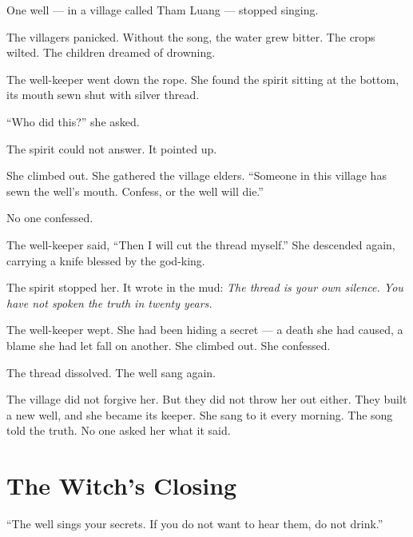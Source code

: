 \documentclass[10pt,twoside]{book}
\begin{document}
One well --- in a village called Tham Luang --- stopped singing.

The villagers panicked. Without the song, the water grew bitter. The crops wilted. The children dreamed of drowning.

The well-keeper went down the rope. She found the spirit sitting at the bottom, its mouth sewn shut with silver thread.

``Who did this?'' she asked.

The spirit could not answer. It pointed up.

She climbed out. She gathered the village elders. ``Someone in this village has sewn the well's mouth. Confess, or the well will die.''

No one confessed.

The well-keeper said, ``Then I will cut the thread myself.'' She descended again, carrying a knife blessed by the god-king.

The spirit stopped her. It wrote in the mud: \textit{The thread is your own silence. You have not spoken the truth in twenty years.}

The well-keeper wept. She had been hiding a secret --- a death she had caused, a blame she had let fall on another. She climbed out. She confessed.

The thread dissolved. The well sang again.

The village did not forgive her. But they did not throw her out either. They built a new well, and she became its keeper. She sang to it every morning. The song told the truth. No one asked her what it said.

\section*{The Witch's Closing}
``The well sings your secrets. If you do not want to hear them, do not drink.''
\end{document}
